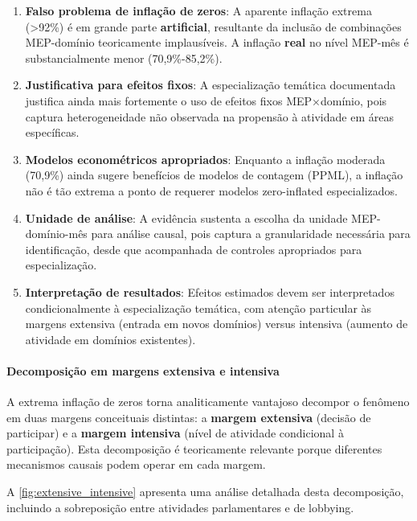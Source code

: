 \begin{enumerate}
    \item \textbf{Falso problema de inflação de zeros}: A aparente inflação extrema (>92\%) é em grande parte \textbf{artificial}, resultante da inclusão de combinações MEP-domínio teoricamente implausíveis. A inflação \textbf{real} no nível MEP-mês é substancialmente menor (70,9\%-85,2\%).
    
    \item \textbf{Justificativa para efeitos fixos}: A especialização temática documentada justifica ainda mais fortemente o uso de efeitos fixos MEP×domínio, pois captura heterogeneidade não observada na propensão à atividade em áreas específicas.
    
    \item \textbf{Modelos econométricos apropriados}: Enquanto a inflação moderada (70,9\%) ainda sugere benefícios de modelos de contagem (PPML), a inflação não é tão extrema a ponto de requerer modelos zero-inflated especializados.
    
    \item \textbf{Unidade de análise}: A evidência sustenta a escolha da unidade MEP-domínio-mês para análise causal, pois captura a granularidade necessária para identificação, desde que acompanhada de controles apropriados para especialização.
    
    \item \textbf{Interpretação de resultados}: Efeitos estimados devem ser interpretados condicionalmente à especialização temática, com atenção particular às margens extensiva (entrada em novos domínios) versus intensiva (aumento de atividade em domínios existentes).
\end{enumerate}

\paragraph{Decomposição em margens extensiva e intensiva}

A extrema inflação de zeros torna analiticamente vantajoso decompor o fenômeno em duas margens conceituais distintas: a \textbf{margem extensiva} (decisão de participar) e a \textbf{margem intensiva} (nível de atividade condicional à participação). Esta decomposição é teoricamente relevante porque diferentes mecanismos causais podem operar em cada margem.

A \autoref{fig:extensive_intensive} apresenta uma análise detalhada desta decomposição, incluindo a sobreposição entre atividades parlamentares e de lobbying.


